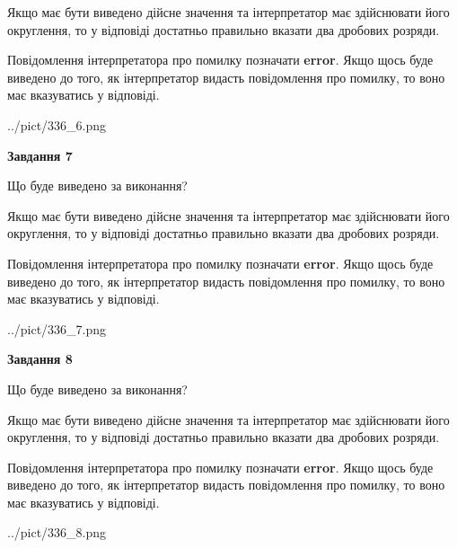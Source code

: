 \documentclass[12pt, ukrainian]{article}
\begin{document}
{\begin {Large}
Якщо має бути виведено дійсне значення та інтерпретатор має здійснювати його округлення, 
то у відповіді достатньо правильно вказати два дробових розряди.

Повідомлення інтерпретатора про помилку позначати \textbf{error}.
Якщо щось буде виведено до того, як інтерпретатор видасть повідомлення про помилку, 
то воно має вказуватись у відповіді. \par

\begin{center}
	{../pict/336_6.png}
\end{center}
\newpage

{\begin {center}\textbf{Завдання 7}\end {center}}\par
Що буде виведено за виконання? \par

Якщо має бути виведено дійсне значення та інтерпретатор має здійснювати його округлення, 
то у відповіді достатньо правильно вказати два дробових розряди.

Повідомлення інтерпретатора про помилку позначати \textbf{error}.
Якщо щось буде виведено до того, як інтерпретатор видасть повідомлення про помилку, 
то воно має вказуватись у відповіді. \par

\begin{center}
	{../pict/336_7.png}
\end{center}
\newpage

{\begin {center}\textbf{Завдання 8}\end {center}}\par
Що буде виведено за виконання? \par

Якщо має бути виведено дійсне значення та інтерпретатор має здійснювати його округлення, 
то у відповіді достатньо правильно вказати два дробових розряди.

Повідомлення інтерпретатора про помилку позначати \textbf{error}.
Якщо щось буде виведено до того, як інтерпретатор видасть повідомлення про помилку, 
то воно має вказуватись у відповіді. \par

\begin{center}
	{../pict/336_8.png}
\end{center}
\newpage


\end{Large}}
\end{document}
